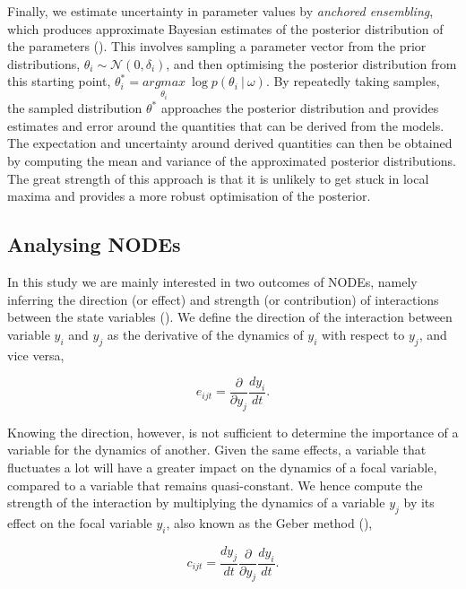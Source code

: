 \documentclass[11pt, oneside]{article}
\begin{document}
Finally, we estimate uncertainty in parameter values by \textit{anchored ensembling}, which produces approximate Bayesian estimates of the posterior distribution of the parameters (\cite{Pearce2018}).
This involves sampling a parameter vector from the prior distributions, $\theta_{i} \sim \mathcal{N}(0,\delta_{i})$, and then optimising the posterior distribution from this starting point, $\theta^*_i = \underset{\theta_i}{argmax}~\log p(\theta_i~|~\omega)$.
By repeatedly taking samples, the sampled distribution $\theta^*$ approaches the posterior distribution and provides estimates and error around the quantities that can be derived from the models.
The expectation and uncertainty around derived quantities can then be obtained by computing the mean and variance of the approximated posterior distributions.
The great strength of this approach is that it is unlikely to get stuck in local maxima and provides a more robust optimisation of the posterior.

\subsection{Analysing NODEs}

In this study we are mainly interested in two outcomes of NODEs, namely inferring the direction (or effect) and strength (or contribution) of interactions between the state variables (\cite{Bonnaffe2021a}).
We define the direction of the interaction between variable $y_i$ and $y_j$ as the derivative of the dynamics of $y_i$ with respect to $y_j$, and vice versa, 

\vspace{-0.5cm}
\begin{equation}
    e_{ijt} = \frac{\partial}{\partial y_j} \frac{dy_i}{dt}.
\end{equation}

Knowing the direction, however, is not sufficient to determine the importance of a variable for the dynamics of another. 
Given the same effects, a variable that fluctuates a lot will have a greater impact on the dynamics of a focal variable, compared to a variable that remains quasi-constant.
We hence compute the strength of the interaction by multiplying the dynamics of a variable $y_j$ by its effect on the focal variable $y_i$, also known as the Geber method (\cite{Hairston2005}),

\vspace{-0.5cm}
\begin{equation}
    c_{ijt} = \frac{dy_j}{dt} \frac{\partial}{\partial y_j} \frac{dy_i}{dt}.
\end{equation}
\end{document}
